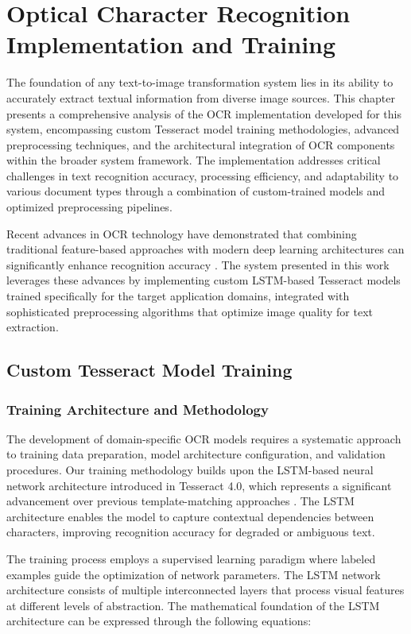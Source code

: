 \chapter{Optical Character Recognition Implementation and Training}

The foundation of any text-to-image transformation system lies in its ability to accurately extract textual information from diverse image sources. This chapter presents a comprehensive analysis of the OCR implementation developed for this system, encompassing custom Tesseract model training methodologies, advanced preprocessing techniques, and the architectural integration of OCR components within the broader system framework. The implementation addresses critical challenges in text recognition accuracy, processing efficiency, and adaptability to various document types through a combination of custom-trained models and optimized preprocessing pipelines.

Recent advances in OCR technology have demonstrated that combining traditional feature-based approaches with modern deep learning architectures can significantly enhance recognition accuracy \cite{clausner2020optical}. The system presented in this work leverages these advances by implementing custom LSTM-based Tesseract models trained specifically for the target application domains, integrated with sophisticated preprocessing algorithms that optimize image quality for text extraction.

\section{Custom Tesseract Model Training}

\subsection{Training Architecture and Methodology}

The development of domain-specific OCR models requires a systematic approach to training data preparation, model architecture configuration, and validation procedures. Our training methodology builds upon the LSTM-based neural network architecture introduced in Tesseract 4.0, which represents a significant advancement over previous template-matching approaches \cite{breuel2013high}. The LSTM architecture enables the model to capture contextual dependencies between characters, improving recognition accuracy for degraded or ambiguous text.

The training process employs a supervised learning paradigm where labeled examples guide the optimization of network parameters. The LSTM network architecture consists of multiple interconnected layers that process visual features at different levels of abstraction. The mathematical foundation of the LSTM architecture can be expressed through the following equations:


